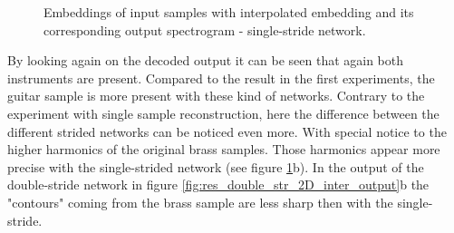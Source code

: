 \begin{figure}[htb!]
    \centering
    \captionsetup{justification=centering}
    \caption{Embeddings of input samples with interpolated embedding and its corresponding output spectrogram - single-stride network.}
    \label{fig:res_single_str_2D_inter_output}
\end{figure}

By looking again on the decoded output it can be seen that again both instruments are present. Compared to the result in the first experiments, the guitar sample is more present with these kind of networks. Contrary to the experiment with single sample reconstruction, here the difference between the different strided networks can be noticed even more. With special notice to the higher harmonics of the original brass samples. Those harmonics appear more precise with the single-strided network (see figure \ref{fig:res_single_str_2D_inter_output}b). In the output of the double-stride network in figure \ref{fig:res_double_str_2D_inter_output}b the "contours" coming from the brass sample are less sharp then with the single-stride.

